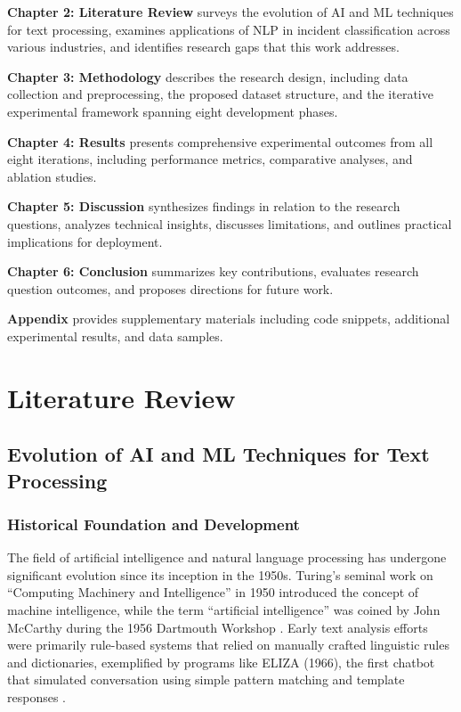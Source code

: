 \documentclass[11pt, titlepage, bibliography=totoc]{scrreprt}
\begin{document}
\textbf{Chapter 2: Literature Review} surveys the evolution of AI and ML techniques for text processing, examines applications of NLP in incident classification across various industries, and identifies research gaps that this work addresses.

\textbf{Chapter 3: Methodology} describes the research design, including data collection and preprocessing, the proposed dataset structure, and the iterative experimental framework spanning eight development phases.

\textbf{Chapter 4: Results} presents comprehensive experimental outcomes from all eight iterations, including performance metrics, comparative analyses, and ablation studies.

\textbf{Chapter 5: Discussion} synthesizes findings in relation to the research questions, analyzes technical insights, discusses limitations, and outlines practical implications for deployment.

\textbf{Chapter 6: Conclusion} summarizes key contributions, evaluates research question outcomes, and proposes directions for future work.

\textbf{Appendix} provides supplementary materials including code snippets, additional experimental results, and data samples.

\newpage



\chapter{Literature Review}

\section{Evolution of AI and ML Techniques for Text Processing}

\subsection{Historical Foundation and Development}
The field of artificial intelligence and natural language processing has undergone significant evolution since its inception in the 1950s. Turing's seminal work on ``Computing Machinery and Intelligence'' in 1950 introduced the concept of machine intelligence, while the term ``artificial intelligence'' was coined by John McCarthy during the 1956 Dartmouth Workshop \cite{mccarthy1955}. Early text analysis efforts were primarily rule-based systems that relied on manually crafted linguistic rules and dictionaries, exemplified by programs like \textsc{ELIZA} (1966), the first chatbot that simulated conversation using simple pattern matching and template responses \cite{weizenbaum1966}.
\end{document}
